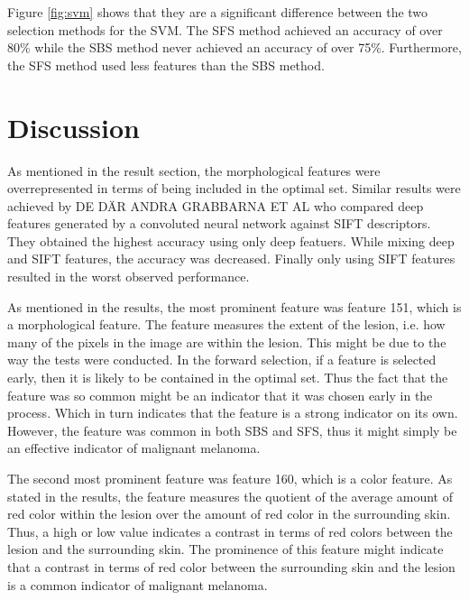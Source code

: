 \documentclass{kththesis}
\begin{document}
Figure \ref{fig:svm} shows that they are a significant difference between the two selection methods for the SVM. The SFS method achieved an accuracy of over 80\% while the SBS method never achieved an accuracy of over 75\%. Furthermore, the SFS method used less features than the SBS method.

\chapter{Discussion}

As mentioned in the result section, the morphological features were overrepresented in terms of being included in the optimal set. Similar results were achieved by DE DÄR ANDRA GRABBARNA ET AL %
who compared deep features generated by a convoluted neural network against SIFT descriptors. They obtained the highest accuracy using only deep featuers. While mixing deep and SIFT features, the accuracy was decreased. Finally only using SIFT features resulted in the worst observed performance. 

As mentioned in the results, the most prominent feature was feature 151, which is a morphological feature. The feature measures the extent of the lesion, i.e. how many of the pixels in the image are within the lesion. This might be due to the way the tests were conducted. In the forward selection, if a feature is selected early, then it is likely to be contained in the optimal set. Thus the fact that the feature was so common might be an indicator that it was chosen early in the process. Which in turn indicates that the feature is a strong indicator on its own. However, the feature was common in both SBS and SFS, thus it might simply be an effective indicator of malignant melanoma.

The second most prominent feature was feature 160, which is a color feature. As stated in the results, the feature measures the quotient of the average amount of red color within the lesion over the amount of red color in the surrounding skin. Thus, a high or low value indicates a contrast in terms of red colors between the lesion and the surrounding skin. The prominence of this feature might indicate that a contrast in terms of red color between the surrounding skin and the lesion is a common indicator of malignant melanoma. %
\end{document}
